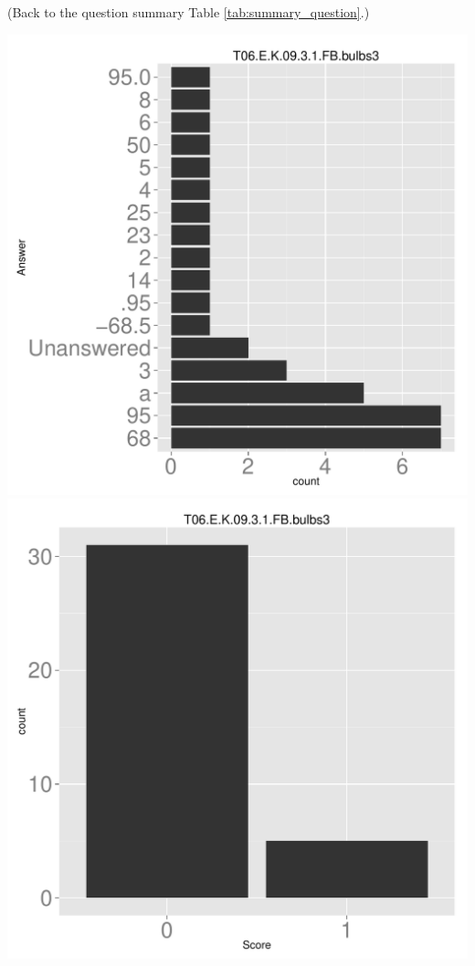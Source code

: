 \documentclass[12pt,nohyper]{tufte-handout}\usepackage[]{graphicx}\usepackage[]{color}
\begin{document}
 (Back to the question summary Table \ref{tab:summary_question}.)

\begin{center} \includegraphics[width=.45\linewidth]{Topic06_35_answer} \includegraphics[width=.45\linewidth]{Topic06_35_score} \end{center} 
\end{document}
